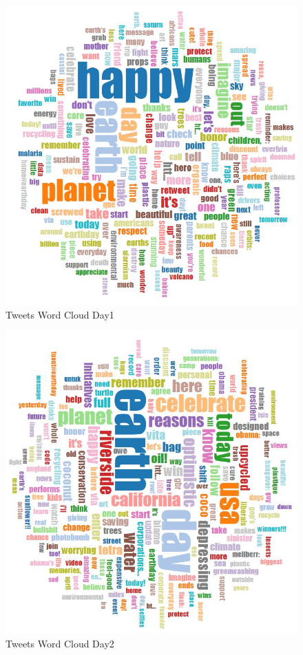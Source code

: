 \begin{figure}[ht]
	\begin{center}
		 \includegraphics[scale=0.90]{wordcloudday1}
		  \caption{Tweets Word Cloud Day1}
	 \end{center}
\end{figure}
\begin{figure}[ht]
	\begin{center}
		 \includegraphics[scale=0.90]{wordcloudday2}
		  \caption{Tweets Word Cloud Day2}
	 \end{center}
\end{figure}
